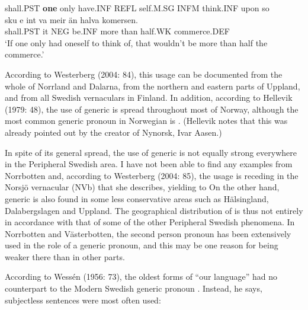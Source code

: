shall.PST  \textbf{one} only  have.INF  REFL  self.M.SG  INFM  think.INF  upon  so\\ %


\ea\label{}
\gll sku  e  int  va  meir  än  halva  komersen.\\


shall.PST   it  NEG  be.INF  more  than  half.WK  commerce.DEF\\ %


‘If one only had oneself to think of, that wouldn’t be more than half the commerce.’
\z


According to Westerberg (2004: 84), this usage can be documented from the whole of Norrland and Dalarna, from the northern and eastern parts of Uppland, and from all Swedish vernaculars in Finland. In addition, according to Hellevik (1979: 48), the use of generic  is spread throughout most of Norway, although the most common generic pronoun in Norwegian is . (Hellevik notes that this was already pointed out by the creator of Nynorsk, Ivar Aasen.)

In spite of its general spread, the use of generic  is not equally strong everywhere in the Peripheral Swedish area. I have not been able to find any examples from Norrbotten and, according to Westerberg (2004: 85), the usage is receding in the Norsjö vernacular (NVb) that she describes, yielding to On the other hand, generic  is also found in some less conservative areas such as Hälsingland, Dalabergslagen and Uppland. The geographical distribution of  is thus not entirely in accordance with that of some of the other Peripheral Swedish phenomena. In Norrbotten and Västerbotten, the second person pronoun  has been extensively used in the role of a generic pronoun, and this may be one reason for  being weaker there than in other parts. 

According to Wessén (1956: 73), the oldest forms of “our language” had no counterpart to the Modern Swedish generic pronoun . Instead, he says, subjectless sentences were most often used: 

